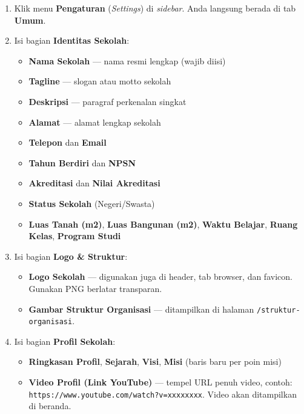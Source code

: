 \begin{enumerate}
  \item Klik menu \textbf{Pengaturan} (\textit{Settings}) di \textit{sidebar}.
        Anda langsung berada di tab \textbf{Umum}.
  \item Isi bagian \textbf{Identitas Sekolah}:
        \begin{itemize}
          \item \textbf{Nama Sekolah} --- nama resmi lengkap (wajib diisi)
          \item \textbf{Tagline} --- slogan atau motto sekolah
          \item \textbf{Deskripsi} --- paragraf perkenalan singkat
          \item \textbf{Alamat} --- alamat lengkap sekolah
          \item \textbf{Telepon} dan \textbf{Email}
          \item \textbf{Tahun Berdiri} dan \textbf{NPSN}
          \item \textbf{Akreditasi} dan \textbf{Nilai Akreditasi}
          \item \textbf{Status Sekolah} (Negeri/Swasta)
          \item \textbf{Luas Tanah (m2)}, \textbf{Luas Bangunan (m2)},
                \textbf{Waktu Belajar}, \textbf{Ruang Kelas}, \textbf{Program Studi}
        \end{itemize}
  \item Isi bagian \textbf{Logo \& Struktur}:
        \begin{itemize}
          \item \textbf{Logo Sekolah} --- digunakan juga di header, tab browser,
                dan favicon. Gunakan PNG berlatar transparan.
          \item \textbf{Gambar Struktur Organisasi} --- ditampilkan di halaman
                \texttt{/struktur-organisasi}.
        \end{itemize}
  \item Isi bagian \textbf{Profil Sekolah}:
        \begin{itemize}
          \item \textbf{Ringkasan Profil}, \textbf{Sejarah}, \textbf{Visi},
                \textbf{Misi} (baris baru per poin misi)
          \item \textbf{Video Profil (Link YouTube)} --- tempel URL penuh video,
                contoh: \texttt{https://www.youtube.com/watch?v=xxxxxxxx}.
                Video akan ditampilkan di beranda.
        \end{itemize}

\end{enumerate}
